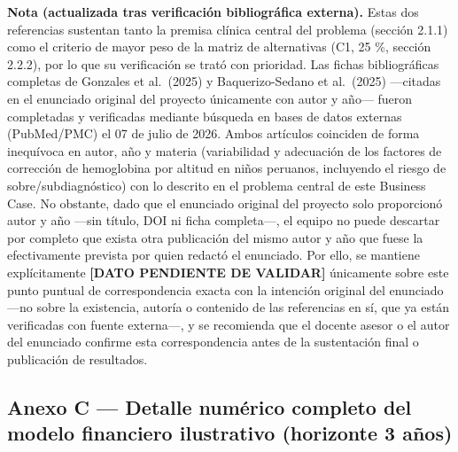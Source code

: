 \documentclass[11pt,a4paper]{article}
\begin{document}
\textbf{Nota (actualizada tras verificación bibliográfica externa).} Estas dos referencias sustentan tanto la premisa clínica central del problema (sección 2.1.1) como el criterio de mayor peso de la matriz de alternativas (C1, 25 \%, sección 2.2.2), por lo que su verificación se trató con prioridad. Las fichas bibliográficas completas de Gonzales et al.~(2025) y Baquerizo-Sedano et al.~(2025) ---citadas en el enunciado original del proyecto únicamente con autor y año--- fueron completadas y verificadas mediante búsqueda en bases de datos externas (PubMed/PMC) el 07 de julio de 2026. Ambos artículos coinciden de forma inequívoca en autor, año y materia (variabilidad y adecuación de los factores de corrección de hemoglobina por altitud en niños peruanos, incluyendo el riesgo de sobre/subdiagnóstico) con lo descrito en el problema central de este Business Case. No obstante, dado que el enunciado original del proyecto solo proporcionó autor y año ---sin título, DOI ni ficha completa---, el equipo no puede descartar por completo que exista otra publicación del mismo autor y año que fuese la efectivamente prevista por quien redactó el enunciado. Por ello, se mantiene explícitamente \textbf{{[}DATO PENDIENTE DE VALIDAR{]}} únicamente sobre este punto puntual de correspondencia exacta con la intención original del enunciado ---no sobre la existencia, autoría o contenido de las referencias en sí, que ya están verificadas con fuente externa---, y se recomienda que el docente asesor o el autor del enunciado confirme esta correspondencia antes de la sustentación final o publicación de resultados.

\subsection{Anexo C --- Detalle numérico completo del modelo financiero ilustrativo (horizonte 3 años)}\label{anexo-c-detalle-numuxe9rico-completo-del-modelo-financiero-ilustrativo-horizonte-3-auxf1os}
\end{document}
